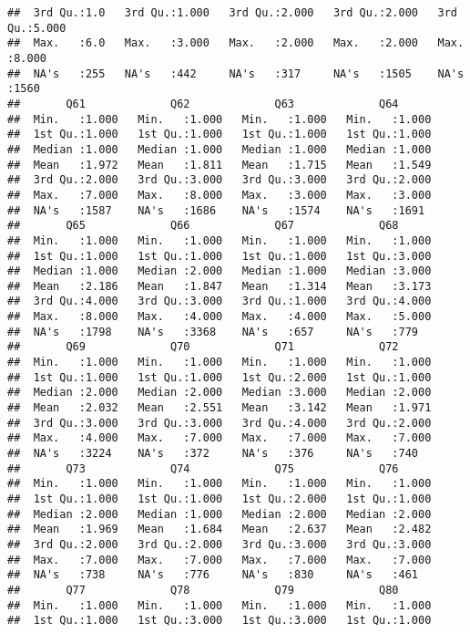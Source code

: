 \documentclass[
]{article}
\begin{document}
\begin{verbatim}
##  3rd Qu.:1.0   3rd Qu.:1.000   3rd Qu.:2.000   3rd Qu.:2.000   3rd Qu.:5.000  
##  Max.   :6.0   Max.   :3.000   Max.   :2.000   Max.   :2.000   Max.   :8.000  
##  NA's   :255   NA's   :442     NA's   :317     NA's   :1505    NA's   :1560   
##       Q61             Q62             Q63             Q64       
##  Min.   :1.000   Min.   :1.000   Min.   :1.000   Min.   :1.000  
##  1st Qu.:1.000   1st Qu.:1.000   1st Qu.:1.000   1st Qu.:1.000  
##  Median :1.000   Median :1.000   Median :1.000   Median :1.000  
##  Mean   :1.972   Mean   :1.811   Mean   :1.715   Mean   :1.549  
##  3rd Qu.:2.000   3rd Qu.:3.000   3rd Qu.:3.000   3rd Qu.:2.000  
##  Max.   :7.000   Max.   :8.000   Max.   :3.000   Max.   :3.000  
##  NA's   :1587    NA's   :1686    NA's   :1574    NA's   :1691   
##       Q65             Q66             Q67             Q68       
##  Min.   :1.000   Min.   :1.000   Min.   :1.000   Min.   :1.000  
##  1st Qu.:1.000   1st Qu.:1.000   1st Qu.:1.000   1st Qu.:3.000  
##  Median :1.000   Median :2.000   Median :1.000   Median :3.000  
##  Mean   :2.186   Mean   :1.847   Mean   :1.314   Mean   :3.173  
##  3rd Qu.:4.000   3rd Qu.:3.000   3rd Qu.:1.000   3rd Qu.:4.000  
##  Max.   :8.000   Max.   :4.000   Max.   :4.000   Max.   :5.000  
##  NA's   :1798    NA's   :3368    NA's   :657     NA's   :779    
##       Q69             Q70             Q71             Q72       
##  Min.   :1.000   Min.   :1.000   Min.   :1.000   Min.   :1.000  
##  1st Qu.:1.000   1st Qu.:1.000   1st Qu.:2.000   1st Qu.:1.000  
##  Median :2.000   Median :2.000   Median :3.000   Median :2.000  
##  Mean   :2.032   Mean   :2.551   Mean   :3.142   Mean   :1.971  
##  3rd Qu.:3.000   3rd Qu.:3.000   3rd Qu.:4.000   3rd Qu.:2.000  
##  Max.   :4.000   Max.   :7.000   Max.   :7.000   Max.   :7.000  
##  NA's   :3224    NA's   :372     NA's   :376     NA's   :740    
##       Q73             Q74             Q75             Q76       
##  Min.   :1.000   Min.   :1.000   Min.   :1.000   Min.   :1.000  
##  1st Qu.:1.000   1st Qu.:1.000   1st Qu.:2.000   1st Qu.:1.000  
##  Median :2.000   Median :1.000   Median :2.000   Median :2.000  
##  Mean   :1.969   Mean   :1.684   Mean   :2.637   Mean   :2.482  
##  3rd Qu.:2.000   3rd Qu.:2.000   3rd Qu.:3.000   3rd Qu.:3.000  
##  Max.   :7.000   Max.   :7.000   Max.   :7.000   Max.   :7.000  
##  NA's   :738     NA's   :776     NA's   :830     NA's   :461    
##       Q77             Q78             Q79             Q80       
##  Min.   :1.000   Min.   :1.000   Min.   :1.000   Min.   :1.000  
##  1st Qu.:1.000   1st Qu.:3.000   1st Qu.:3.000   1st Qu.:1.000  

\end{verbatim}
\end{document}
